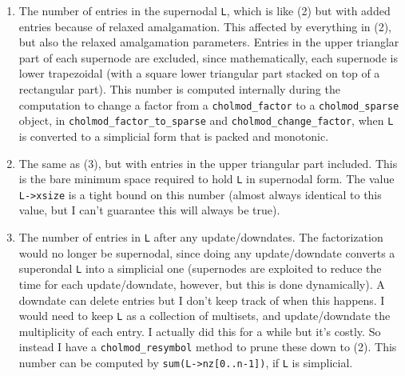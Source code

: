 \documentclass[11pt]{article}
\begin{document}
\begin{enumerate}
{\small
\begin{verbatim}
    [count] = symbfact (A, ...) ;    % built-in
    sum (count)

    [count] = symbfact2 (A, ...) ;   % mine, but it's the same as symbfact
    sum (count)

    [count, h, parent, post, R] = symbfact (A, ...) ;    % built-in
    nnz (R)

    [count, h, parent, post, R] = symbfact2 (A, ...) ;   % mine, the same
    nnz (R)

    [count, h, parent, post, L] = symbfact2 (A, ..., 'L') ; % mine, with L not R
    nnz (L)
\end{verbatim}}

Internally the built-in MATLAB \verb'symbfact' function calls CHOLMOD.
The \verb'L' or \verb'R' matrix returned above has the entire pattern,
but where each entry is equal to one.

\item
The number of entries in the supernodal \verb'L', which is like (2) but with
added entries because of relaxed amalgamation. This affected by everything in
(2), but also the relaxed amalgamation parameters.  Entries in the upper
trianglar part of each supernode are excluded, since mathematically, each
supernode is lower trapezoidal (with a square lower triangular part stacked on
top of a rectangular part).  This number is computed internally during
the computation to change a factor from a \verb'cholmod_factor' to a
\verb'cholmod_sparse' object, in \verb'cholmod_factor_to_sparse'
and \verb'cholmod_change_factor', when \verb'L' is converted to a
simplicial form that is packed and monotonic.

\item
The same as (3), but with entries in the upper triangular part included.  This
is the bare minimum space required to hold \verb'L' in supernodal form.  The
value \verb'L->xsize' is a tight bound on this number (almost always identical
to this value, but I can't guarantee this will always be true).

\item
The number of entries in \verb'L' after any update/downdates.  The
factorization would no longer be supernodal, since doing any update/downdate
converts a superondal \verb'L' into a simplicial one (supernodes are exploited
to reduce the time for each update/downdate, however, but this is done
dynamically).  A downdate can delete entries but I don't keep track of when
this happens.  I would need to keep \verb'L' as a collection of multisets, and
update/downdate the multiplicity of each entry.  I actually did this for a
while but it's costly.  So instead I have a \verb'cholmod_resymbol' method to
prune these down to (2).  This number can be computed by
\verb'sum(L->nz[0..n-1])', if \verb'L' is simplicial.


\end{enumerate}
\end{document}

